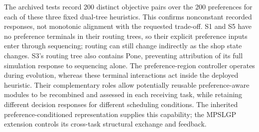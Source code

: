 The archived tests record 200 distinct objective pairs over the 200 preferences for each of these three fixed dual-tree heuristics. This confirms nonconstant recorded responses, not monotonic alignment with the requested trade-off. S1 and S5 have no preference terminals in their routing trees, so their explicit preference inputs enter through sequencing; routing can still change indirectly as the shop state changes. S3's routing tree also contains Pone, preventing attribution of its full simulation response to sequencing alone. The preference-region controller operates during evolution, whereas these terminal interactions act inside the deployed heuristic. Their complementary roles allow potentially reusable preference-aware modules to be recombined and assessed in each receiving task, while retaining different decision responses for different scheduling conditions. The inherited preference-conditioned representation supplies this capability; the MPSLGP extension controls its cross-task structural exchange and feedback.